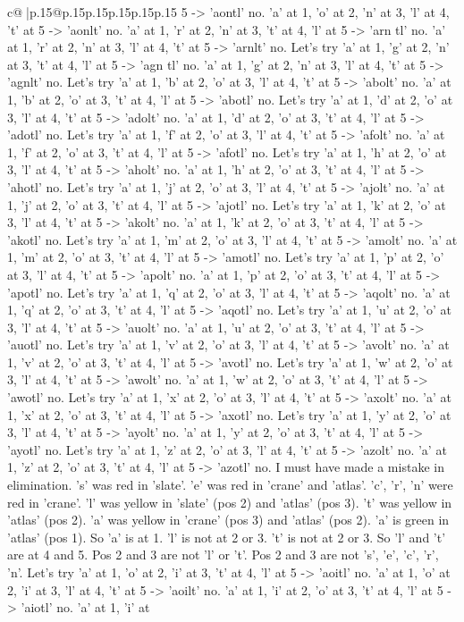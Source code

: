 \documentclass{article}
\begin{document}
{\begin{supertabular}{c@{$\;$}|p{.15\linewidth}@{}p{.15\linewidth}p{.15\linewidth}p{.15\linewidth}p{.15\linewidth}p{.15\linewidth}}
{{{5 {-}> 'aontl' no. 'a' at 1, 'o' at 2, 'n' at 3, 'l' at 4, 't' at 5 {-}> 'aonlt' no. 'a' at 1, 'r' at 2, 'n' at 3, 't' at 4, 'l' at 5 {-}> 'arn tl' no. 'a' at 1, 'r' at 2, 'n' at 3, 'l' at 4, 't' at 5 {-}> 'arnlt' no. Let's try 'a' at 1, 'g' at 2, 'n' at 3, 't' at 4, 'l' at 5 {-}> 'agn tl' no. 'a' at 1, 'g' at 2, 'n' at 3, 'l' at 4, 't' at 5 {-}> 'agnlt' no. Let's try 'a' at 1, 'b' at 2, 'o' at 3, 'l' at 4, 't' at 5 {-}> 'abolt' no. 'a' at 1, 'b' at 2, 'o' at 3, 't' at 4, 'l' at 5 {-}> 'abotl' no. Let's try 'a' at 1, 'd' at 2, 'o' at 3, 'l' at 4, 't' at 5 {-}> 'adolt' no. 'a' at 1, 'd' at 2, 'o' at 3, 't' at 4, 'l' at 5 {-}> 'adotl' no. Let's try 'a' at 1, 'f' at 2, 'o' at 3, 'l' at 4, 't' at 5 {-}> 'afolt' no. 'a' at 1, 'f' at 2, 'o' at 3, 't' at 4, 'l' at 5 {-}> 'afotl' no. Let's try 'a' at 1, 'h' at 2, 'o' at 3, 'l' at 4, 't' at 5 {-}> 'aholt' no. 'a' at 1, 'h' at 2, 'o' at 3, 't' at 4, 'l' at 5 {-}> 'ahotl' no. Let's try 'a' at 1, 'j' at 2, 'o' at 3, 'l' at 4, 't' at 5 {-}> 'ajolt' no. 'a' at 1, 'j' at 2, 'o' at 3, 't' at 4, 'l' at 5 {-}> 'ajotl' no. Let's try 'a' at 1, 'k' at 2, 'o' at 3, 'l' at 4, 't' at 5 {-}> 'akolt' no. 'a' at 1, 'k' at 2, 'o' at 3, 't' at 4, 'l' at 5 {-}> 'akotl' no. Let's try 'a' at 1, 'm' at 2, 'o' at 3, 'l' at 4, 't' at 5 {-}> 'amolt' no. 'a' at 1, 'm' at 2, 'o' at 3, 't' at 4, 'l' at 5 {-}> 'amotl' no. Let's try 'a' at 1, 'p' at 2, 'o' at 3, 'l' at 4, 't' at 5 {-}> 'apolt' no. 'a' at 1, 'p' at 2, 'o' at 3, 't' at 4, 'l' at 5 {-}> 'apotl' no. Let's try 'a' at 1, 'q' at 2, 'o' at 3, 'l' at 4, 't' at 5 {-}> 'aqolt' no. 'a' at 1, 'q' at 2, 'o' at 3, 't' at 4, 'l' at 5 {-}> 'aqotl' no. Let's try 'a' at 1, 'u' at 2, 'o' at 3, 'l' at 4, 't' at 5 {-}> 'auolt' no. 'a' at 1, 'u' at 2, 'o' at 3, 't' at 4, 'l' at 5 {-}> 'auotl' no. Let's try 'a' at 1, 'v' at 2, 'o' at 3, 'l' at 4, 't' at 5 {-}> 'avolt' no. 'a' at 1, 'v' at 2, 'o' at 3, 't' at 4, 'l' at 5 {-}> 'avotl' no. Let's try 'a' at 1, 'w' at 2, 'o' at 3, 'l' at 4, 't' at 5 {-}> 'awolt' no. 'a' at 1, 'w' at 2, 'o' at 3, 't' at 4, 'l' at 5 {-}> 'awotl' no. Let's try 'a' at 1, 'x' at 2, 'o' at 3, 'l' at 4, 't' at 5 {-}> 'axolt' no. 'a' at 1, 'x' at 2, 'o' at 3, 't' at 4, 'l' at 5 {-}> 'axotl' no. Let's try 'a' at 1, 'y' at 2, 'o' at 3, 'l' at 4, 't' at 5 {-}> 'ayolt' no. 'a' at 1, 'y' at 2, 'o' at 3, 't' at 4, 'l' at 5 {-}> 'ayotl' no. Let's try 'a' at 1, 'z' at 2, 'o' at 3, 'l' at 4, 't' at 5 {-}> 'azolt' no. 'a' at 1, 'z' at 2, 'o' at 3, 't' at 4, 'l' at 5 {-}> 'azotl' no. I must have made a mistake in elimination. 's' was red in 'slate'. 'e' was red in 'crane' and 'atlas'. 'c', 'r', 'n' were red in 'crane'. 'l' was yellow in 'slate' (pos 2) and 'atlas' (pos 3). 't' was yellow in 'atlas' (pos 2). 'a' was yellow in 'crane' (pos 3) and 'atlas' (pos 2). 'a' is green in 'atlas' (pos 1). So 'a' is at 1. 'l' is not at 2 or 3. 't' is not at 2 or 3. So 'l' and 't' are at 4 and 5. Pos 2 and 3 are not 'l' or 't'. Pos 2 and 3 are not 's', 'e', 'c', 'r', 'n'. Let's try 'a' at 1, 'o' at 2, 'i' at 3, 't' at 4, 'l' at 5 {-}> 'aoitl' no. 'a' at 1, 'o' at 2, 'i' at 3, 'l' at 4, 't' at 5 {-}> 'aoilt' no. 'a' at 1, 'i' at 2, 'o' at 3, 't' at 4, 'l' at 5 {-}> 'aiotl' no. 'a' at 1, 'i' at }}}
\end{supertabular}}
\end{document}
